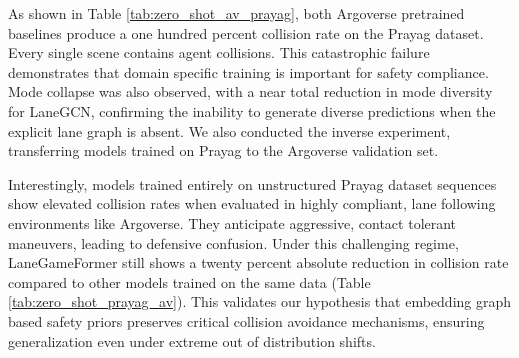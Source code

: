\documentclass{article}
\begin{document}
\begin{table}[htbp]
\centering
\caption{Zero Shot Transfer: Argoverse to Prayag}
\label{tab:zero_shot_av_prayag}
\end{table}

As shown in Table \ref{tab:zero_shot_av_prayag}, both Argoverse pretrained baselines produce a one hundred percent collision rate on the Prayag dataset. Every single scene contains agent collisions. This catastrophic failure demonstrates that domain specific training is important for safety compliance. Mode collapse was also observed, with a near total reduction in mode diversity for LaneGCN, confirming the inability to generate diverse predictions when the explicit lane graph is absent. We also conducted the inverse experiment, transferring models trained on Prayag to the Argoverse validation set.

\begin{table}[htbp]
\centering
\caption{Zero Shot Transfer: Prayag to Argoverse 2}
\label{tab:zero_shot_prayag_av}
\end{table}

Interestingly, models trained entirely on unstructured Prayag dataset sequences show elevated collision rates when evaluated in highly compliant, lane following environments like Argoverse. They anticipate aggressive, contact tolerant maneuvers, leading to defensive confusion. Under this challenging regime, LaneGameFormer still shows a twenty percent absolute reduction in collision rate compared to other models trained on the same data (Table \ref{tab:zero_shot_prayag_av}). This validates our hypothesis that embedding graph based safety priors preserves critical collision avoidance mechanisms, ensuring generalization even under extreme out of distribution shifts.
\end{document}
